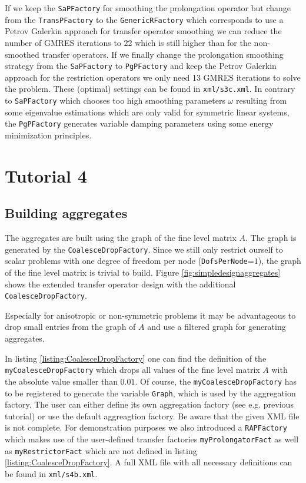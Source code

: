 \documentclass[12pt,a4paper]{article}
\begin{document}
If we keep the \verb|SaPFactory| for smoothing the prolongation operator but change from the \verb|TransPFactory| to the \verb|GenericRFactory| which corresponds to use a Petrov Galerkin approach for transfer operator smoothing we can reduce the number of GMRES iterations to 22 which is still higher than for the non-smoothed transfer operators. If we finally change the prolongation smoothing strategy from the \verb|SaPFactory| to \verb|PgPFactory| and keep the Petrov Galerkin approach for the restriction operators we only need 13 GMRES iterations to solve the problem. These (optimal) settings can be found in \verb|xml/s3c.xml|. In contrary to \verb|SaPFactory| which chooses too high smoothing parameters $\omega$ resulting from some eigenvalue estimations which are only valid for symmetric linear systems, the \verb|PgPFactory| generates variable damping parameters using some energy minimization principles.

\section{Tutorial 4}

\subsection{Building aggregates}

The aggregates are built using the graph of the fine level matrix $A$. The graph is generated by the \verb|CoalesceDropFactory|. Since we still only restrict ourself to scalar problems with one degree of freedom per node (\verb|DofsPerNode|=$1$), the graph of the fine level matrix is trivial to build.
Figure \ref{fig:simpledesignaggregates} shows the extended transfer operator design with the additional \verb|CoalesceDropFactory|.

Especially for anisotropic or non-symmetric problems it may be advantageous to drop small entries from the graph of $A$ and use a filtered graph for generating aggregates. 

In listing \ref{listing:CoalesceDropFactory} one can find the definition of the \verb|myCoalesceDropFactory| which drops all values of the fine level matrix $A$ with the absolute value smaller than $0.01$. Of course, the \verb|myCoalesceDropFactory| has to be registered to generate the variable \verb|Graph|, which is used by the aggregation factory. The user can either define its own aggregation factory (see e.g. previous tutorial) or use the default aggreagtion factory. Be aware that the given XML file is not complete. For demonstration purposes we also introduced a \verb|RAPFactory| which makes use of the user-defined transfer factories \verb|myProlongatorFact| as well as \verb|myRestrictorFact| which are not defined in listing \ref{listing:CoalesceDropFactory}. A full XML file with all necessary definitions can be found in \verb|xml/s4b.xml|.
\end{document}
